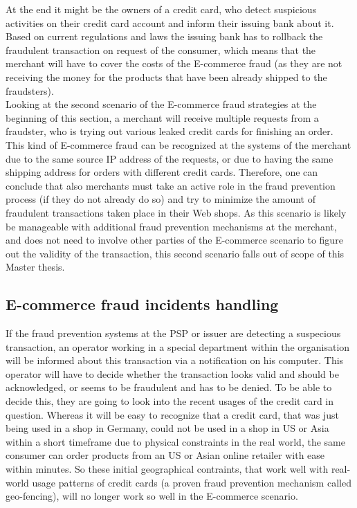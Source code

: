 At the end it might be the owners of a credit card, who detect suspicious activities on their credit card account and inform their issuing bank about it. Based on current regulations and laws the issuing bank has to rollback the fraudulent transaction on request of the consumer, which means that the merchant will have to cover the costs of the \gls{E-commerce} fraud (as they are not receiving the money for the products that have been already shipped to the fraudsters). \\

Looking at the second scenario of the \gls{E-commerce} fraud strategies at the beginning of this section, a merchant will receive multiple requests from a fraudster, who is trying out various leaked credit cards for finishing an order. This kind of \gls{E-commerce} fraud can be recognized at the systems of the merchant due to the same source \gls{IP} address of the requests, or due to having the same shipping address for orders with different credit cards. Therefore, one can conclude that also merchants must take an active role in the fraud prevention process (if they do not already do so) and try to minimize the amount of fraudulent transactions taken place in their Web shops. As this scenario is likely be manageable with additional fraud prevention mechanisms at the merchant, and does not need to involve other parties of the \gls{E-commerce} scenario to figure out the validity of the transaction, this second scenario falls out of scope of this Master thesis.


\subsection{E-commerce fraud incidents handling}
\label{subsec:e_commerce_fraud_handling}

If the fraud prevention systems at the \gls{PSP} or issuer are detecting a suspecious transaction, an operator working in a special department within the organisation will be informed about this transaction via a notification on his computer. This operator will have to decide whether the transaction looks valid and should be acknowledged, or seems to be fraudulent and has to be denied. To be able to decide this, they are going to look into the recent usages of the credit card in question. Whereas it will be easy to recognize that a credit card, that was just being used in a shop in Germany, could not be used in a shop in US or Asia within a short timeframe due to physical constraints in the real world, the same consumer can order products from an US or Asian online retailer with ease within minutes. So these initial geographical contraints, that work well with real-world usage patterns of credit cards (a proven fraud prevention mechanism called geo-fencing), will no longer work so well in the \gls{E-commerce} scenario. \\


